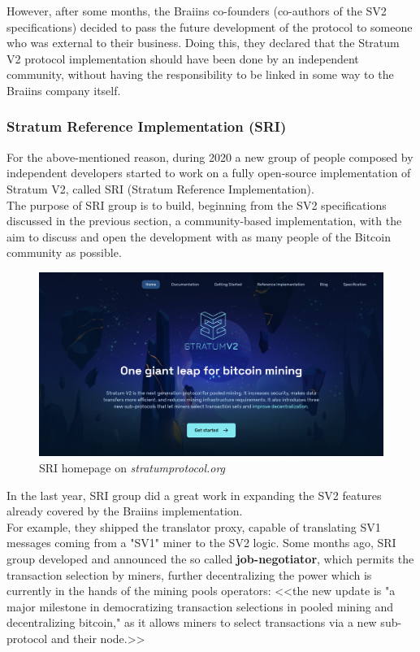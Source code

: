 \noindent However, after some months, the Braiins co-founders (co-authors of the SV2 specifications) decided to pass the future development of the protocol to someone who was external to their business. Doing this, they declared that the Stratum V2 protocol implementation should have been done by an independent community, without having the responsibility to be linked in some way to the Braiins company itself.

\subsubsection{\textbf{Stratum Reference Implementation (SRI)}}\label{SRI_intro}
For the above-mentioned reason, during 2020 a new group of people composed by independent developers started to work on a fully open-source implementation of Stratum V2, called SRI (Stratum Reference Implementation).\\
The purpose of SRI group is to build, beginning from the SV2 specifications discussed in the previous section, a community-based implementation, with the aim to discuss and open the development with as many people of the Bitcoin community as possible.

\begin{figure}[h!]
    \centering
    \includegraphics[width=15cm]{Figures/sv2/sv2_8.png}
    \caption{SRI homepage on {\textit{stratumprotocol.org}}}
    \label{fig:sv2_8}
\end{figure}
\noindent In the last year, SRI group did a great work in expanding the SV2 features already covered by the Braiins implementation. \\
For example, they shipped the translator proxy, capable of translating SV1 messages coming from a "SV1" miner to the SV2 logic. Some months ago, SRI group developed and announced the so called \textbf{job-negotiator}, which permits the transaction selection by miners, further decentralizing the power which is currently in the hands of the mining pools operators: <<the new update is "a major milestone in democratizing transaction selections in pooled mining and decentralizing bitcoin," as it allows miners to select transactions via a new sub-protocol and their node.>> \cite{bitcoinmagazinesv2}\\

